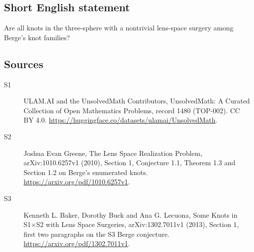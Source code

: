\documentclass[11pt]{article}
\begin{document}
\subsection{Short English statement}
Are all knots in the three-sphere with a nontrivial lens-space surgery among Berge’s knot families?
\subsection{Sources}
\begin{description}
\item[\hypertarget{source:1480:1}{S1}] ULAM.AI and the UnsolvedMath Contributors, UnsolvedMath: A Curated Collection of Open Mathematics Problems, record 1480 (TOP-002). CC BY 4.0. \url{https://huggingface.co/datasets/ulamai/UnsolvedMath}.
\item[\hypertarget{source:1480:2}{S2}] Joshua Evan Greene, The Lens Space Realization Problem, arXiv:1010.6257v1 (2010), Section 1, Conjecture 1.1, Theorem 1.3 and Section 1.2 on Berge’s enumerated knots. \url{https://arxiv.org/pdf/1010.6257v1}.
\item[\hypertarget{source:1480:3}{S3}] Kenneth L. Baker, Dorothy Buck and Ana G. Lecuona, Some Knots in S1×S2 with Lens Space Surgeries, arXiv:1302.7011v1 (2013), Section 1, first two paragraphs on the S3 Berge conjecture. \url{https://arxiv.org/pdf/1302.7011v1}.
\end{description}
\label{end:1480}
\end{document}
